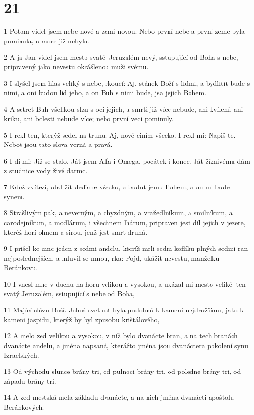 \chapter{21}

\par 1 Potom videl jsem nebe nové a zemi novou. Nebo první nebe a první zeme byla pominula, a more již nebylo.
\par 2 A já Jan videl jsem mesto svaté, Jeruzalém nový, sstupující od Boha s nebe, pripravený jako nevestu okrášlenou muži svému.
\par 3 I slyšel jsem hlas veliký s nebe, rkoucí: Aj, stánek Boží s lidmi, a bydlitit bude s nimi, a oni budou lid jeho, a on Buh s nimi bude, jsa jejich Bohem.
\par 4 A setret Buh všelikou slzu s ocí jejich, a smrti již více nebude, ani kvílení, ani kriku, ani bolesti nebude více; nebo první veci pominuly.
\par 5 I rekl ten, kterýž sedel na trunu: Aj, nové ciním všecko. I rekl mi: Napiš to. Nebot jsou tato slova verná a pravá.
\par 6 I dí mi: Již se stalo. Ját jsem Alfa i Omega, pocátek i konec. Ját žíznivému dám z studnice vody živé darmo.
\par 7 Kdož zvítezí, obdržít dedicne všecko, a budut jemu Bohem, a on mi bude synem.
\par 8 Strašlivým pak, a neverným, a ohyzdným, a vražedlníkum, a smilníkum, a carodejníkum, a modlárum, i všechnem lhárum, pripraven jest díl jejich v jezere, kteréž horí ohnem a sirou, jenž jest smrt druhá.
\par 9 I prišel ke mne jeden z sedmi andelu, kteríž meli sedm koflíku plných sedmi ran nejposlednejších, a mluvil se mnou, rka: Pojd, ukážit nevestu, manželku Beránkovu.
\par 10 I vnesl mne v duchu na horu velikou a vysokou, a ukázal mi mesto veliké, ten svatý Jeruzalém, sstupující s nebe od Boha,
\par 11 Mající slávu Boží. Jehož svetlost byla podobná k kameni nejdražšímu, jako k kameni jaspidu, kterýž by byl zpusobu krištálového,
\par 12 A melo zed velikou a vysokou, v níž bylo dvanácte bran, a na tech branách dvanácte andelu, a jména napsaná, kterážto jména jsou dvanáctera pokolení synu Izraelských.
\par 13 Od východu slunce brány tri, od pulnoci brány tri, od poledne brány tri, od západu brány tri.
\par 14 A zed mestská mela základu dvanácte, a na nich jména dvanácti apoštolu Beránkových.
